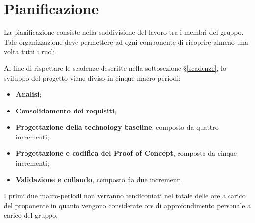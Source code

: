 \documentclass[../piano-di-progetto.tex]{subfiles}
\begin{document}
\section{Pianificazione}
\label{section:pian}

La pianificazione consiste nella suddivisione del lavoro tra i membri del gruppo. Tale organizzazione deve permettere ad ogni componente di ricoprire almeno una volta tutti i ruoli.

Al fine di rispettare le scadenze descritte nella sottosezione \S\ref{scadenze}, lo sviluppo del progetto viene diviso in cinque macro-periodi:
\begin{itemize}
    \item \textbf{Analisi};
    \item \textbf{Consolidamento dei requisiti};
    \item \textbf{Progettazione della technology baseline}, composto da quattro incrementi;
    \item \textbf{Progettazione e codifica del Proof of Concept}, composto da cinque incrementi;
    \item \textbf{Validazione e collaudo}, composto da due incrementi.
\end{itemize}
I primi due macro-periodi non verranno rendicontati nel totale delle ore a carico del proponente in quanto vengono considerate ore di approfondimento personale a carico del gruppo.






\end{document}
